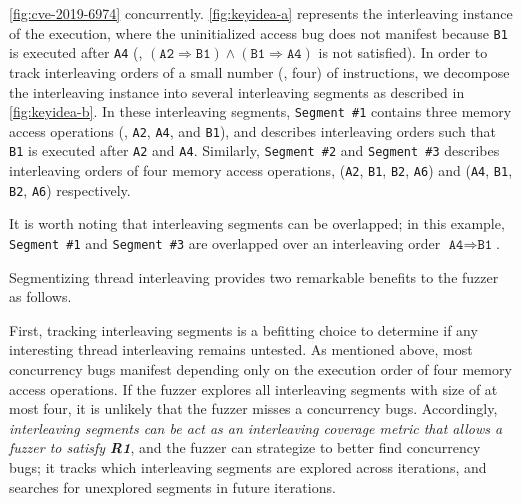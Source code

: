 \autoref{fig:cve-2019-6974} concurrently.
%
\autoref{fig:keyidea-a} represents the interleaving instance of the
execution, where the uninitialized access bug does not manifest
because \texttt{B1} is executed after \texttt{A4} (\ie,
$(\texttt{A2} \Rightarrow \texttt{B1}) \wedge (\texttt{B1} \Rightarrow
\texttt{A4})$ is not satisfied).
%
In order to track interleaving orders of a small number (\eg, four) of
instructions, we decompose the interleaving instance into several
interleaving segments as described in \autoref{fig:keyidea-b}.
%
In these interleaving segments, \texttt{Segment \#1} contains three
memory access operations (\ie, \texttt{A2}, \texttt{A4}, and
\texttt{B1}), and describes interleaving orders such that \texttt{B1}
is executed after \texttt{A2} and \texttt{A4}.
%
Similarly, \texttt{Segment \#2} and \texttt{Segment \#3} describes
interleaving orders of four memory access operations, (\texttt{A2},
\texttt{B1}, \texttt{B2}, \texttt{A6}) and (\texttt{A4}, \texttt{B1},
\texttt{B2}, \texttt{A6}) respectively.
%



%
It is worth noting that interleaving segments can be overlapped; in
this example, \texttt{Segment \#1} and \texttt{Segment \#3} are
overlapped over an interleaving order
$\texttt{A4} \Rightarrow \texttt{B1}$.




%
Segmentizing thread interleaving provides two remarkable benefits to
the fuzzer as follows.



First, tracking interleaving segments is a befitting choice to
determine if any interesting thread interleaving remains untested.
%
As mentioned above, most concurrency bugs manifest depending only on
the execution order of four memory access operations. If the fuzzer
explores all interleaving segments with size of at most four, it is
unlikely that the fuzzer misses a concurrency bugs.
%
Accordingly, \textit{interleaving segments can be act as an
  interleaving coverage metric that allows a fuzzer to satisfy
  \textbf{R1}}, and the fuzzer can strategize to better find
concurrency bugs; it tracks which interleaving segments are explored
across iterations, and searches for unexplored segments in future
iterations.



